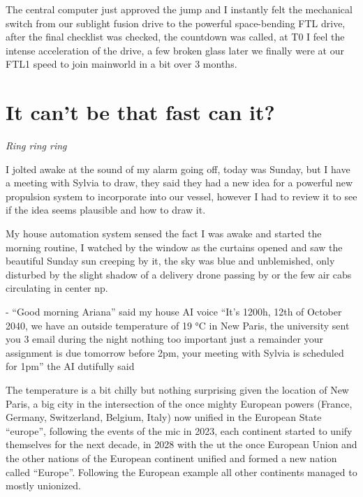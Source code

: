 \documentclass[hidelinks,12pt,a4paper]{book}
\begin{document}
The central computer just approved the jump and I instantly felt the mechanical switch 
from our sublight fusion drive to the powerful space-bending FTL drive, 
after the final checklist was checked, the countdown was called, at T0 I feel the intense acceleration of the drive, 
a few broken glass later we finally were at our FTL1 speed to join mainworld in a bit over 3 months.\par


\chapter{It can't be that fast can it?}

\textit{Ring ring ring}\par
I jolted awake at the sound of my alarm going off, 
today was Sunday, but I have a meeting with Sylvia to draw, 
they said they had a new idea for a powerful new propulsion system to incorporate into our vessel, however 
I had to review it to see if the idea seems plausible and how to draw it.\par
\bigskip
My house automation system sensed the fact I was awake and 
started the morning routine, I watched by the window as the curtains opened and 
saw the beautiful Sunday sun creeping by it, the sky was blue and unblemished, only disturbed by the 
slight shadow of a delivery drone passing by or the few air cabs circulating in center \gls{np}.\par
\bigskip
- “Good morning Ariana” said my house AI voice\newline
“It's 1200h, 12th of October 2040, we have an outside temperature of 19 °C in New Paris, 
the university sent you 3 email during the night nothing too important just a remainder your 
assignment is due tomorrow before 2pm, your meeting with Sylvia is scheduled for 1pm” the AI dutifully said\par
\bigskip

The temperature is a bit chilly but nothing surprising given the location of New Paris,
a big city in the intersection of the once mighty European powers (France, Germany, Switzerland, Belgium, Italy) 
now unified in the European State “\gls{europe}”, following the events of the \gls{mic} in 2023, 
each continent started to unify themselves for the next decade, in 2028 with the \gls{ut} the once European Union 
and the other nations of the European continent unified and formed a new nation called “Europe”. 
Following the European example all other continents managed to mostly unionized.\par
\bigskip 
\end{document}
